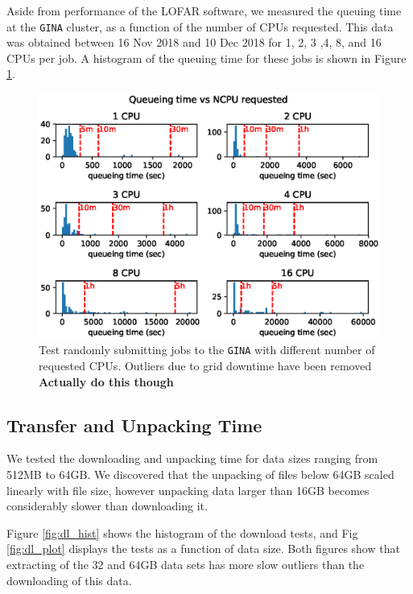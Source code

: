 \documentclass[preprint,5p]{elsarticle}
\begin{document}
Aside from performance of the LOFAR software, we measured the queuing time at the \texttt{GINA} cluster, as a function of the number of CPUs requested. This data was obtained between 16 Nov 2018 and 10 Dec 2018 for 1, 2, 3 ,4, 8, and 16 CPUs per job. A histogram of the queuing time for these jobs is shown in Figure \ref{fig:queue_NCPU}.

\begin{figure}
    \includegraphics[width=0.95\linewidth]{figures/Queue_NCPU.eps}
      \caption{Test randomly submitting jobs to the \texttt{GINA} with different number of requested CPUs. Outliers due to grid downtime have been removed \textbf{Actually do this though} }
	\label{fig:queue_NCPU}
\end{figure}


\subsection{Transfer and Unpacking Time}

We tested the downloading and unpacking time for data sizes ranging from 512MB to 64GB. We discovered that the unpacking of files below 64GB scaled linearly with file size, however unpacking data larger than 16GB becomes considerably slower than downloading it. 

Figure \ref{fig:dl_hist} shows the histogram of the download tests, and Fig \ref{fig:dl_plot} displays the tests as a function of data size. Both figures show that extracting of the 32 and 64GB data sets has more slow outliers than the downloading of this data. 
\end{document}
